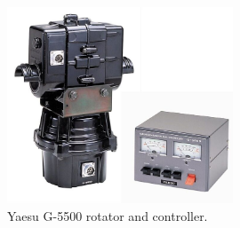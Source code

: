 \begin{figure}[!ht]
    \begin{center}
        \includegraphics[width=0.6\textwidth]{figures/g5500.jpg}
        \caption{Yaesu G-5500 rotator and controller.}
        \label{fig:g5500}
    \end{center}
\end{figure}

